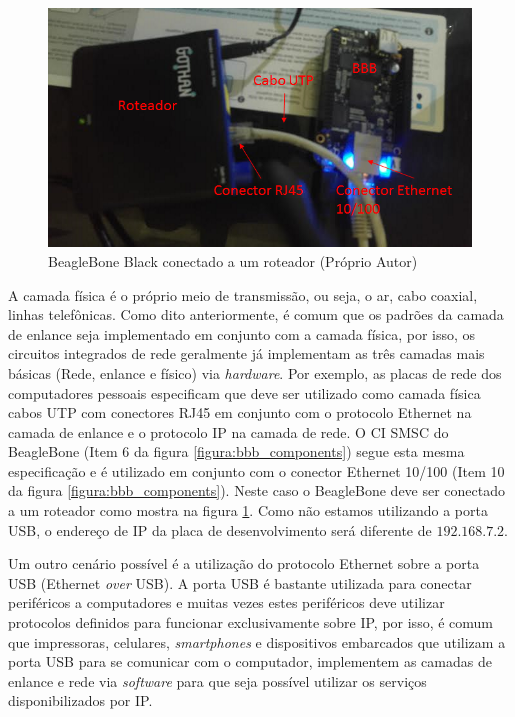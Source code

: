 \begin{figure}[h]
	\centering
	\includegraphics[width=\textwidth]{figuras/bbb_roteador.png}
	\caption{BeagleBone Black conectado a um roteador (Próprio Autor)}
	\label{figura:bbb_roteador}
\end{figure}

A camada física é o próprio meio de transmissão, ou seja, o ar, cabo coaxial, linhas telefônicas. Como dito anteriormente, é comum que os padrões da camada de enlance seja implementado em conjunto com a camada física, por isso, os circuitos integrados de rede geralmente já implementam as três camadas mais básicas (Rede, enlance e físico) via \emph{hardware}. Por exemplo, as placas de rede dos computadores pessoais especificam que deve ser utilizado como camada física cabos UTP com conectores RJ45 em conjunto com o protocolo Ethernet na camada de enlance e o protocolo IP na camada de rede. O CI SMSC do BeagleBone (Item 6 da figura \ref{figura:bbb_components}) segue esta mesma especificação e é utilizado em conjunto com o conector Ethernet 10/100 (Item 10 da figura \ref{figura:bbb_components}). Neste caso o BeagleBone deve ser conectado a um roteador como mostra na figura \ref{figura:bbb_roteador}. Como não estamos utilizando a porta USB, o endereço de IP da placa de desenvolvimento será diferente de $192.168.7.2$.

Um outro cenário possível é a utilização do protocolo Ethernet sobre a porta USB (Ethernet \emph{over} USB).  A porta USB é bastante utilizada para conectar periféricos a computadores e muitas vezes estes periféricos deve utilizar protocolos definidos para funcionar exclusivamente sobre IP, por isso, é comum que impressoras, celulares, \emph{smartphones} e dispositivos embarcados que utilizam a porta USB para se comunicar com o computador, implementem as camadas de enlance e rede via \emph{software} para que seja possível utilizar os serviços disponibilizados por IP. 

